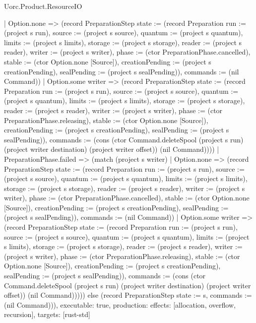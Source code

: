 \begin{lexlean}{Uorc.Product.ResourceIO}
\begin{semanticmodule}
{      | Option.none => (record PreparationStep {state := (record Preparation {run := (project s run), source := (project s source), quantum := (project s quantum), limits := (project s limits), storage := (project s storage), reader := (project s reader), writer := (project s writer), phase := (ctor PreparationPhase.cancelled), stable := (ctor Option.none [Source]), creationPending := (project s creationPending), sealPending := (project s sealPending)}), commands := (nil Command)})
      | Option.some writer => (record PreparationStep {state := (record Preparation {run := (project s run), source := (project s source), quantum := (project s quantum), limits := (project s limits), storage := (project s storage), reader := (project s reader), writer := (project s writer), phase := (ctor PreparationPhase.releasing), stable := (ctor Option.none [Source]), creationPending := (project s creationPending), sealPending := (project s sealPending)}), commands := (cons (ctor Command.deleteSpool (project s run) (project writer destination) (project writer offset)) (nil Command))}))
    | PreparationPhase.failed => (match (project s writer)
      | Option.none => (record PreparationStep {state := (record Preparation {run := (project s run), source := (project s source), quantum := (project s quantum), limits := (project s limits), storage := (project s storage), reader := (project s reader), writer := (project s writer), phase := (ctor PreparationPhase.cancelled), stable := (ctor Option.none [Source]), creationPending := (project s creationPending), sealPending := (project s sealPending)}), commands := (nil Command)})
      | Option.some writer => (record PreparationStep {state := (record Preparation {run := (project s run), source := (project s source), quantum := (project s quantum), limits := (project s limits), storage := (project s storage), reader := (project s reader), writer := (project s writer), phase := (ctor PreparationPhase.releasing), stable := (ctor Option.none [Source]), creationPending := (project s creationPending), sealPending := (project s sealPending)}), commands := (cons (ctor Command.deleteSpool (project s run) (project writer destination) (project writer offset)) (nil Command))}))) else (record PreparationStep {state := s, commands := (nil Command)})),
  executable: true,
  production: {effects: [allocation, overflow, recursion], targets: [rust-std]}
}


\end{semanticmodule}
\end{lexlean}
